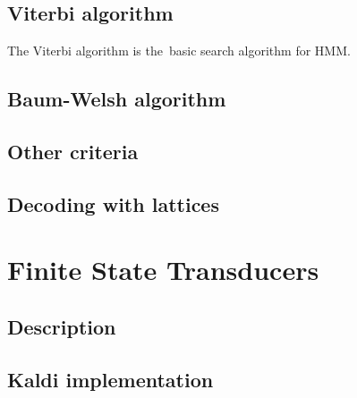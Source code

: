 \subsection*{Viterbi algorithm}
\label{sub:viterbi_algorithm}
The Viterbi algorithm is the~basic search algorithm for \ac{HMM}. 



\subsection{Baum-Welsh algorithm}
\label{sub:baum_welsh_algorithm}





\subsection{Other criteria}
\label{sub:other_criteria}


\subsection{Decoding with lattices}
\label{sub:lattice}





\section{Finite State Transducers} 
\label{sec:fst}

\subsection{Description}
\label{sub:description}


\subsection{Kaldi implementation} %
\label{sec:kaldi}


